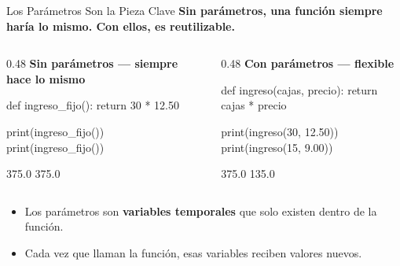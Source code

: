 \documentclass[aspectratio=169, 11pt]{beamer}
\begin{document}
\begin{frame}[fragile,shrink=28]{Los Parámetros Son la Pieza Clave}
  \vspace{-6pt}
  {\footnotesize\color{arcaDark}\bfseries
    Sin parámetros, una función siempre haría lo mismo.
    Con ellos, es reutilizable.}

  \vspace{4pt}
  \begin{columns}[T]
    \begin{column}{0.48\textwidth}
      {\scriptsize\color{arcaRed}\bfseries\faTimesCircle\hspace{4pt}
        Sin parámetros --- siempre hace lo mismo}
      \begin{pyblock}
def ingreso_fijo():
    return 30 * 12.50

print(ingreso_fijo())
print(ingreso_fijo())
      \end{pyblock}
      \vspace{-2pt}
      \begin{outputblock}
375.0
375.0
      \end{outputblock}
    \end{column}

    \begin{column}{0.48\textwidth}
      {\scriptsize\color{codeGreen}\bfseries\faCheckCircle\hspace{4pt}
        Con parámetros --- flexible}
      \begin{pyblock}
def ingreso(cajas, precio):
    return cajas * precio

print(ingreso(30, 12.50))
print(ingreso(15, 9.00))
      \end{pyblock}
      \vspace{-2pt}
      \begin{outputblock}
375.0
135.0
      \end{outputblock}
    \end{column}
  \end{columns}

  \vspace{2pt}
  {\scriptsize\color{textMuted}
  \begin{itemize}\setlength{\itemsep}{2pt}
    \item[{\color{arcaRed}\scriptsize\faArrowRight}]
      Los parámetros son \textbf{variables temporales}
      que solo existen dentro de la función.
    \item[{\color{arcaRed}\scriptsize\faArrowRight}]
      Cada vez que llaman la función, esas variables
      reciben valores nuevos.
  \end{itemize}
  }
\end{frame}
\end{document}
